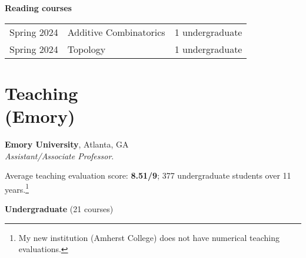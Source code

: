 \documentclass[margin,line]{res}
\newcommand{\defi}[1]{\textsf{#1}} 				%
\begin{document}
\begin{resume}
{\bf Reading courses} 
\vspace*{-.1in}

\begin{tabular}{rll}  
Spring 2024 &\defi{Additive Combinatorics}  & 1 undergraduate            \\
Spring 2024 &\defi{Topology}  & 1 undergraduate\\
\end{tabular}

\vspace{-7pt}
\section{\sc Teaching \\ (Emory)}

{\bf Emory University}, Atlanta, GA\\
\emph{Assistant/Associate Professor}. 
\vspace{2pt}

Average teaching evaluation score: \textbf{8.51/9}; 377 undergraduate students over 11 years.\footnote{My new institution (Amherst College) does not have numerical teaching evaluations.} 
\vspace{2pt}



{\bf Undergraduate} (21 courses)
\vspace*{-.1in}


\end{resume}
\end{document}
